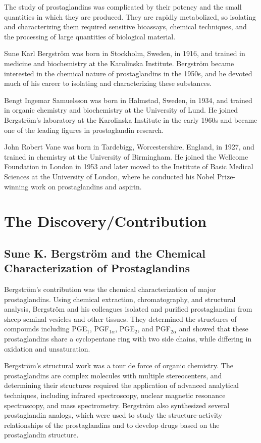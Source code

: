 The study of prostaglandins was complicated by their potency and the small quantities in which they are produced. They are rapidly metabolized, so isolating and characterizing them required sensitive bioassays, chemical techniques, and the processing of large quantities of biological material.

Sune Karl Bergstr\"om was born in Stockholm, Sweden, in 1916, and trained in medicine and biochemistry at the Karolinska Institute. Bergstr\"om became interested in the chemical nature of prostaglandins in the 1950s, and he devoted much of his career to isolating and characterizing these substances.

Bengt Ingemar Samuelsson was born in Halmstad, Sweden, in 1934, and trained in organic chemistry and biochemistry at the University of Lund. He joined Bergstr\"om's laboratory at the Karolinska Institute in the early 1960s and became one of the leading figures in prostaglandin research.

John Robert Vane was born in Tardebigg, Worcestershire, England, in 1927, and trained in chemistry at the University of Birmingham. He joined the Wellcome Foundation in London in 1953 and later moved to the Institute of Basic Medical Sciences at the University of London, where he conducted his Nobel Prize-winning work on prostaglandins and aspirin.

\section{The Discovery/Contribution}

\subsection{Sune K. Bergstr\"om and the Chemical Characterization of Prostaglandins}

Bergstr\"om's contribution was the chemical characterization of major prostaglandins. Using chemical extraction, chromatography, and structural analysis, Bergstr\"om and his colleagues isolated and purified prostaglandins from sheep seminal vesicles and other tissues. They determined the structures of compounds including PGE$_1$, PGF$_{1\alpha}$, PGE$_2$, and PGF$_{2\alpha}$ and showed that these prostaglandins share a cyclopentane ring with two side chains, while differing in oxidation and unsaturation.

Bergstr\"om's structural work was a tour de force of organic chemistry. The prostaglandins are complex molecules with multiple stereocenters, and determining their structures required the application of advanced analytical techniques, including infrared spectroscopy, nuclear magnetic resonance spectroscopy, and mass spectrometry. Bergstr\"om also synthesized several prostaglandin analogs, which were used to study the structure-activity relationships of the prostaglandins and to develop drugs based on the prostaglandin structure.

